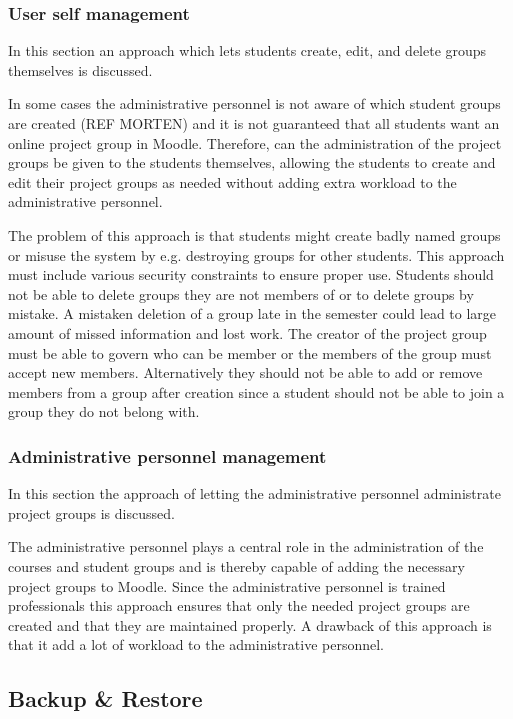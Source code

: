  


\subsubsection{User self management}
In this section an approach which lets students create, edit, and delete groups themselves is discussed. 

In some cases the administrative personnel is not aware of which student groups are created (REF MORTEN) and it is not guaranteed that all students want an online project group in Moodle. 
Therefore, can the administration of the project groups be given to the students themselves, allowing the students to create and edit their project groups as needed without adding extra workload to the administrative personnel.

The problem of this approach is that students might create badly named groups or misuse the system by e.g. destroying groups for other students. 
This approach must include various security constraints to ensure proper use. 
Students should not be able to delete groups they are not members of or to delete groups by mistake. 
A mistaken deletion of a group late in the semester could lead to large amount of missed information and lost work. 
The creator of the project group must be able to govern who can be member or the members of the group must accept new members.
Alternatively they should not be able to add or remove members from a group after creation since a student should not be able to join a group they do not belong with. 





\subsubsection{Administrative personnel management}
In this section the approach of letting the administrative personnel administrate project groups is discussed. 

The administrative personnel plays a central role in the administration of the courses and student groups and is thereby capable of adding the necessary project groups to Moodle. 
Since the administrative personnel is trained professionals this approach ensures that only the needed project groups are created and that they are maintained properly. 
A drawback of this approach is that it add a lot of workload to the administrative personnel. 



\subsection{Backup \& Restore}

